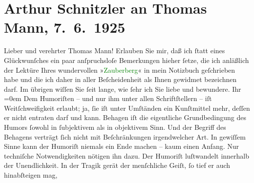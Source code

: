 

               \section[Arthur Schnitzler an Thomas Mann, 7. 6. 1925]{ Arthur Schnitzler an Thomas Mann, 7. 6. 1925}\nopagebreak{}\rehead{ }\normalsize\beginnumbering{} \toendnotes[C]{\smallbreak\pagebreak[2]} \pstart\center{}{\pb}Lieber und verehrter Thomas Mann!\pend\pstart
           Erlauben Sie mir, daß ich ſtatt eines Glückwunſches ein paar anſpruchsloſe
               Bemerkungen hieher ſetze, die ich anläßlich der Lektüre Ihres wundervollen »\textcolor{green}{Zauberberg}{}\ledrightnote{\textcolor{green}{Der Zauberberg. Roman}}« in mein Notizbuch geſchrieben habe
               und die ich daher in aller Beſcheidenheit als Ihnen gewidmet bezeichnen darf. Im
               übrigen wiſſen Sie ſeit lange, wie ſehr ich Sie liebe und bewundere.\pend
           \pstart
           Ihr{\\[\baselineskip]}\spacefill\mbox{}\pend
           \leftskip=0em{}\pstart
           \noindent{}Dem Humoriſten – und nur ihm unter allen Schriftſtellern – iſt Weitſchweifigkeit
                  erlaubt; ja, ſie iſt unter Umſtänden ein Kunſtmittel mehr, deſſen er nicht
                  entraten darf und kann.\pend
           \pstart
           Behagen iſt die eigentliche Grundbedingung des Humors ſowohl in ſubjektivem als in
                  objektivem Sinn. Und der Begriff des Behagens verträgt ſich nicht mit
                  Beſchränkungen irgendwelcher Art. In gewiſſem Sinne kann der Humoriſt niemals ein
                  Ende machen – kaum einen Anfang. Nur techniſche Notwendigkeiten nötigen ihn
                  dazu.\pend
           \pstart
           Der Humoriſt luſtwandelt innerhalb der Unendlichkeit.\pend
           \pstart
           In der Tragik gerät der menſchliche Geiſt, ſo tief er auch hinabſteigen mag,
